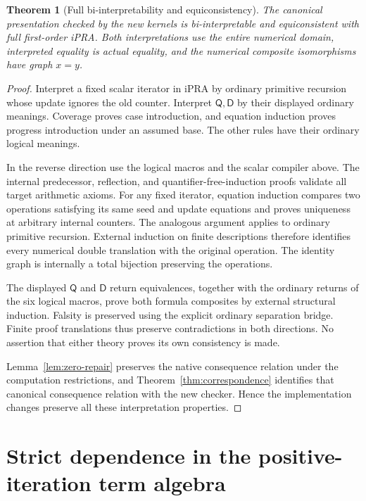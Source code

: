 \documentclass[11pt,letterpaper]{article}
\newtheorem{theorem}{Theorem}[section]
\theoremstyle{definition}\newtheorem{definition}[theorem]{Definition}
\theoremstyle{remark}\newtheorem{remark}[theorem]{Remark}
\newcommand{\D}{\mathsf D}
\newcommand{\Q}{\mathsf Q}
\begin{document}
\begin{theorem}[Full bi-interpretability and equiconsistency]
The canonical presentation checked by the new kernels is bi-interpretable
and equiconsistent with full first-order iPRA. Both interpretations use
the entire numerical domain, interpreted equality is actual equality,
and the numerical composite isomorphisms have graph $x=y$.
\end{theorem}
\begin{proof}
Interpret a fixed scalar iterator in iPRA by ordinary primitive recursion
whose update ignores the old counter. Interpret $\Q,\D$ by their displayed
ordinary meanings. Coverage proves case introduction, and equation
induction proves progress introduction under an assumed base. The other
rules have their ordinary logical meanings.

In the reverse direction use the logical macros and the scalar compiler
above. The internal predecessor, reflection, and quantifier-free-induction
proofs validate all target arithmetic axioms. For any fixed iterator,
equation induction compares two operations satisfying its same seed and
update equations and proves uniqueness at arbitrary internal counters.
The analogous argument applies to ordinary primitive recursion. External
induction on finite descriptions therefore identifies every numerical
double translation with the original operation. The identity graph is
internally a total bijection preserving the operations.

The displayed $\Q$ and $\D$ return equivalences, together with the ordinary
returns of the six logical macros, prove both formula composites by
external structural induction. Falsity is preserved using the explicit
ordinary separation bridge. Finite proof translations thus preserve
contradictions in both directions. No assertion that either theory proves
its own consistency is made.

Lemma~\ref{lem:zero-repair} preserves the native consequence relation
under the computation restrictions, and
Theorem~\ref{thm:correspondence} identifies that canonical consequence
relation with the new checker. Hence the implementation changes preserve
all these interpretation properties.
\end{proof}


\section{Strict dependence in the positive-iteration term algebra}
\label{sec:positive-strict-dependence}
\end{document}
